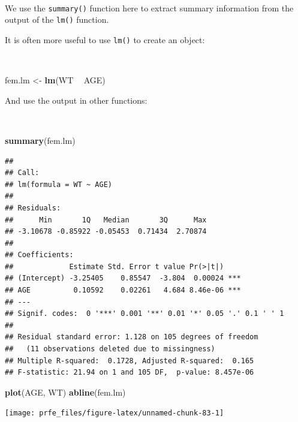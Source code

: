 \documentclass[12pt,a4paper]{book}
\newenvironment{Shaded}{\begin{snugshade}}{\end{snugshade}}
\newcommand{\KeywordTok}[1]{\textcolor[rgb]{0.13,0.29,0.53}{\textbf{#1}}}
\newcommand{\NormalTok}[1]{#1}
\newcommand{\OperatorTok}[1]{\textcolor[rgb]{0.81,0.36,0.00}{\textbf{#1}}}
\newcommand{\StringTok}[1]{\textcolor[rgb]{0.31,0.60,0.02}{#1}}
\theoremstyle{definition}
\theoremstyle{definition}
\theoremstyle{definition}
\theoremstyle{remark}
\begin{document}
~

We use the \texttt{summary()} function here to extract summary
information from the output of the \texttt{lm()} function.

It is often more useful to use \texttt{lm()} to create an object:

~

\begin{Shaded}
\begin{Highlighting}[]
\NormalTok{fem.lm <-}\StringTok{ }\KeywordTok{lm}\NormalTok{(WT }\OperatorTok{~}\StringTok{ }\NormalTok{AGE)}
\end{Highlighting}
\end{Shaded}

\newpage

And use the output in other functions:

~

\begin{Shaded}
\begin{Highlighting}[]
\KeywordTok{summary}\NormalTok{(fem.lm)}
\end{Highlighting}
\end{Shaded}

\begin{verbatim}
## 
## Call:
## lm(formula = WT ~ AGE)
## 
## Residuals:
##      Min       1Q   Median       3Q      Max 
## -3.10678 -0.85922 -0.05453  0.71434  2.70874 
## 
## Coefficients:
##             Estimate Std. Error t value Pr(>|t|)    
## (Intercept) -3.25405    0.85547  -3.804  0.00024 ***
## AGE          0.10592    0.02261   4.684 8.46e-06 ***
## ---
## Signif. codes:  0 '***' 0.001 '**' 0.01 '*' 0.05 '.' 0.1 ' ' 1
## 
## Residual standard error: 1.128 on 105 degrees of freedom
##   (11 observations deleted due to missingness)
## Multiple R-squared:  0.1728, Adjusted R-squared:  0.165 
## F-statistic: 21.94 on 1 and 105 DF,  p-value: 8.457e-06
\end{verbatim}

\newpage

\begin{Shaded}
\begin{Highlighting}[]
\KeywordTok{plot}\NormalTok{(AGE, WT)}
\KeywordTok{abline}\NormalTok{(fem.lm)}
\end{Highlighting}
\end{Shaded}

\begin{center}\texttt{[image: prfe\_files/figure-latex/unnamed-chunk-83-1]} \end{center}
\end{document}
